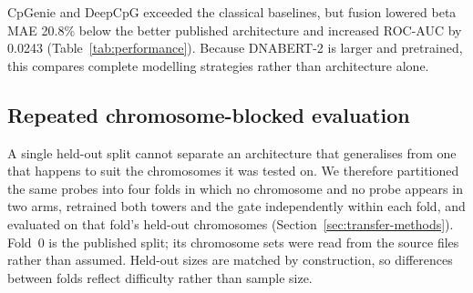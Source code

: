 \documentclass[10pt,letterpaper,twocolumn]{article}
\begin{document}
\begin{table}[t]
\centering
\caption{\textbf{Held-out chr8--9 performance against classical baselines and
published methylation architectures.} Mean $\pm$ SD across three seeds on
26{,}570 CpGs. Every model is fitted on the identical training split with
hyperparameters selected on the identical validation split, so no tissue or data
advantage separates them. The ridge baselines have their regularisation strength
tuned; CpGenie and DeepCpG were reimplemented from their published source and
tuned over the authors' own declared grids (Section~\ref{sec:published-methods}).
Parameter counts: CpGenie 2.0\,M, DeepCpG 4.1\,M, DNABERT-2 encoder 117\,M.}
\label{tab:performance}
\small
{}
\end{table}

{\color{addedred}
CpGenie and DeepCpG exceeded the classical baselines, but fusion lowered beta
MAE 20.8\% below the better published architecture and increased ROC-AUC by
0.0243 (Table~\ref{tab:performance}). Because DNABERT-2 is larger and
pretrained, this compares complete modelling strategies rather than architecture
alone.
}

\color{addedred}
\subsection{Repeated chromosome-blocked evaluation}
\label{sec:folds}

A single held-out split cannot separate an architecture that generalises from
one that happens to suit the chromosomes it was tested on. We therefore
partitioned the same probes into four folds in which no chromosome and no probe
appears in two arms, retrained both towers and the gate independently within
each fold, and evaluated on that fold's held-out chromosomes
(Section~\ref{sec:transfer-methods}). Fold~0 is the published split; its
chromosome sets were read from the source files rather than assumed. Held-out
sizes are matched by construction, so differences between folds reflect
difficulty rather than sample size.
\end{document}
